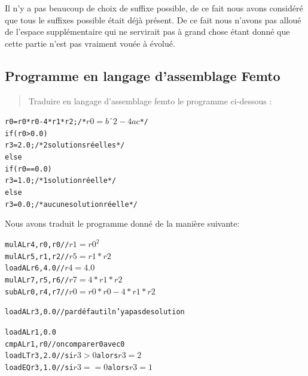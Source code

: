 \documentclass[11pt,a4paper]{article}
\begin{document}
Il n'y a pas beaucoup de choix de suffixe possible, de ce fait nous avons considéré que tous le
suffixes possible était déjà présent. De ce fait nous n'avons pas alloué de l'espace supplémentaire
qui ne servirait pas à grand chose étant donné que cette partie n'est pas vraiment vouée à évolué.


\subsection{Programme en langage d'assemblage Femto}
\begin{quote}
Traduire en langage d’assemblage femto le programme ci-dessous :\end{quote}

\begin{alltt}
r0 = r0*r0 - 4*r1*r2; /* \begin{math} r0 = bˆ2 - 4ac \end{math} */
if (r0 > 0.0)
  r3 = 2.0; /* 2 solutions réelles */
else
  if (r0 == 0.0)
    r3 = 1.0; /* 1 solution réelle */
  else
    r3 = 0.0; /* aucune solution réelle */
\end{alltt}

Nous avons traduit le programme donné de la manière suivante:

\begin{alltt}
mulAL r4, r0, r0 // \begin{math} r1 =  r0^2 \end{math}
mulAL r5, r1, r2 // \begin{math} r5 = r1 * r2 \end{math}
loadAL r6, 4.0   // \begin{math} r4 = 4.0 \end{math}
mulAL r7, r5, r6 // \begin{math} r7 = 4 * r1 * r2 \end{math}
subAL r0, r4, r7 // \begin{math} r0 = r0 * r0 - 4 * r1 * r2 \end{math}

loadAL r3, 0.0   // par défaut il n'y a pas de solution

loadAL r1, 0.0
cmpAL r1, r0     // on compare r0 avec 0
loadLT r3, 2.0   // si \begin{math} r3 > 0 \end{math} alors \begin{math} r3 = 2 \end{math}
loadEQ r3, 1.0   // si \begin{math} r3 == 0 \end{math} alors \begin{math} r3 = 1 \end{math}

\end{alltt}
\end{document}
